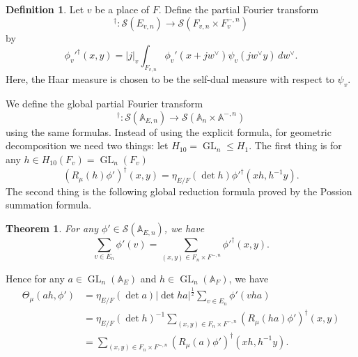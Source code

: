 \documentclass[11pt, reqno]{amsart}
\numberwithin{equation}{subsection}
\theoremstyle{plain}
\newtheorem{theorem}[proposition]{Theorem}
\theoremstyle{definition}
\newtheorem{definition}[proposition]{Definition}
\newcommand{\BA}{\mathbb A}
\newcommand{\CS}{\mathcal{S}}
\renewcommand{\AA}{\mathbb A}
\newcommand{\cS}{\mathcal S}
\DeclareMathOperator{\GL}{GL}
\begin{document}
\begin{definition} Let $v$ be a place of $F$. Define the partial Fourier transform
\[
^\dagger \colon \cS(E_{v,n}) \to \cS(F_{v,n} \times
F_v^{-,n})
\]
by
\[
    \phi_v'^\dagger(x, y) =
    \lvert j \rvert_v \int_{F_{v,n}} \phi_v'(x + jw^\vee) 
    \psi_v(jw^\vee y)\, dw^\vee.
\]
Here, the Haar measure is chosen to be the self-dual measure with respect to $\psi_v$. 

\end{definition}

We define the global partial Fourier transform
$$
^\dagger \colon \cS(\AA_{E,n}) \to  \cS(\AA_n \times \AA^{-,n})
$$ using the same formulas.
Instead of using the explicit formula, for geometric decomposition we need two things: let $H_{10}=\GL_n \leq H_1$. The first thing is for any $h \in H_{10}(F_v)=\GL_n(F_v)$
\[
(R_\mu(h)\phi')^\dagger(x, y) = \eta_{E/F}(\det h) \phi'^\dagger(xh, h^{-1}y).
\]
The second thing is the following global reduction formula proved by the Possion summation formula.
\begin{theorem}
\label{key:reduction-GL}
For any $\phi' \in\CS(\BA_{E, n})$, we have 
\[
\sum_{v \in E_n} \phi'(v) = \sum_{(x, y) \in F_n \times F^{-,n}} \phi'^\dagger (x,y).
\]
\end{theorem}

Hence for any $a \in \GL_n(\BA_E)$ and $h \in \GL_n(\BA_F)$, we have
\begin{align*}
\Theta_\mu(ah, \phi') &=
\eta_{E/F}(\det a) \lvert \det h a \rvert^{\frac 12} \sum_{v \in E_n} \phi'(v h a) \\
&= \eta_{E/F}(\det h)^{-1} \sum_{(x, y)
\in F_n \times F^{-,n}} (R_\mu(ha) \phi')^\dagger (x, y)\\
&=
\sum_{(x, y) \in F_n \times F^{-,n}} (R_\mu(a) \phi')^\dagger (xh, h^{-1}y).
\end{align*}
\end{document}
